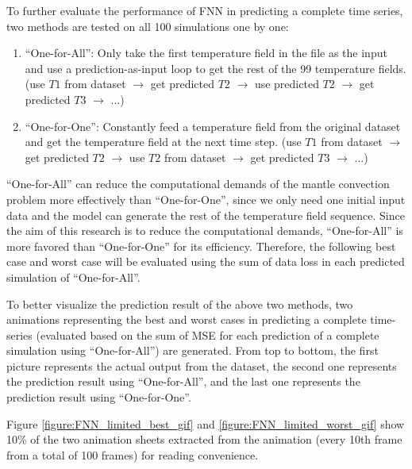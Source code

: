 To further evaluate the performance of FNN in predicting a complete time series, two methods are tested on all 100 simulations one by one: 

\begin{enumerate}
  \item ``One-for-All'': Only take the first temperature field in the file as the input and use a prediction-as-input loop to get the rest of the 99 temperature fields. (use $T1$ from dataset $\rightarrow$ get predicted $T2$ $\rightarrow$ use predicted $T2$ $\rightarrow$ get predicted $T3$ $\rightarrow$ ...)
  \item ``One-for-One'': Constantly feed a temperature field from the original dataset and get the temperature field at the next time step. (use $T1$ from dataset $\rightarrow$ get predicted $T2$ $\rightarrow$ use $T2$ from dataset $\rightarrow$ get predicted $T3$ $\rightarrow$ ...)
\end{enumerate}

 ``One-for-All'' can reduce the computational demands of the mantle convection problem more effectively than ``One-for-One'', since we only need one initial input data and the model can generate the rest of the temperature field sequence. Since the aim of this research is to reduce the computational demands, ``One-for-All'' is more favored than ``One-for-One'' for its efficiency. Therefore, the following best case and worst case will be evaluated using the sum of data loss in each predicted simulation of ``One-for-All''.

To better visualize the prediction result of the above two methods, two animations representing the best and worst cases in predicting a complete time-series (evaluated based on the sum of MSE for each prediction of a complete simulation using ``One-for-All'') are generated. From top to bottom, the first picture represents the actual output from the dataset, the second one represents the prediction result using ``One-for-All'', and the last one represents the prediction result using ``One-for-One''.

Figure \ref{figure:FNN_limited_best_gif} and \ref{figure:FNN_limited_worst_gif} show 10\% of the two animation sheets extracted from the animation (every 10th frame from a total of 100 frames) for reading convenience.


